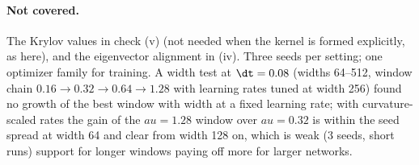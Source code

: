 \paragraph{Not covered.}
The Krylov values in check (v) (not needed when the kernel is formed explicitly, as here), and the eigenvector alignment in (iv).
Three seeds per setting; one optimizer family for training. A width test at $\dt = 0.08$ (widths 64--512, window chain $0.16\to0.32\to0.64\to1.28$ with learning rates tuned at width 256) found no growth of the best window with width at a fixed learning rate; with curvature-scaled rates the gain of the $	au = 1.28$ window over $	au = 0.32$ is within the seed spread at width 64 and clear from width 128 on, which is weak (3 seeds, short runs) support for longer windows paying off more for larger networks.
